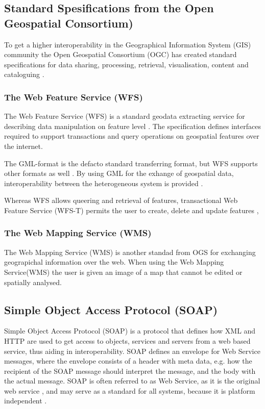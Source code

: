 \subsection{Standard Spesifications from the Open Geospatial Consortium)}\label{OGC}
To get a higher interoperability in the Geographical Information System (GIS) community the Open Geospatial Consortium (OGC) has created standard specifications for data sharing, processing, retrieval, visualisation, content and cataloguing \citep{giuliani2013}.

\subsubsection{The Web Feature Service (WFS)}\label{wfs}

The Web Feature Service (WFS) is a standard geodata extracting service for describing data manipulation on feature level \citep{Peng2005, Norgedigitalt2014}. The specification defines interfaces required to support transactions and query operations on geospatial features over the internet.

The GML-format is the defacto standard transferring format, but WFS supports other formats as well \citep{Eggan2017}. By using GML for the exhange of geospatial data,  interoperability between the heterogeneous system is provided \citep{YaoXiaobai2008Iimo}.

Whereas WFS allows queering and retrieval of features, transactional Web Feature Service (WFS-T) permits the user to create, delete and update features \citep{OGCNetwork},

\subsubsection{The Web Mapping Service (WMS)}
The Web Mapping Service (WMS) is another standad from OGS for exchanging geograpichal information over the web. When using the Web Mapping Service(WMS) the user is given an image of a map that cannot be edited or spatially analysed. 	


\subsection{Simple Object Access Protocol (SOAP)}
Simple Object Access Protocol (SOAP) is a protocol that defines how XML and HTTP are used to get access to objects, services and servers from a web based service, thus aiding in interoperability. SOAP defines an envelope for Web Service messages, where the envelope consists of a header with meta data, e.g. how the recipient of the SOAP message should interpret the message, and the body with the actual message. SOAP is often referred to as Web Service, as it is the original web service \citep{Kartverket2013}, and may serve as a standard for all systems, because it is platform independent \citep{Sipes2004}. 

